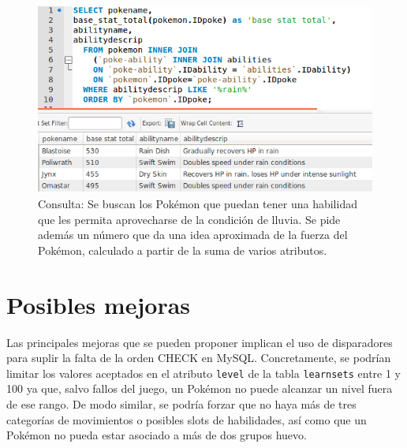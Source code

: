 \documentclass{scrartcl}
\begin{document}
\begin{figure}[ht]
\centering
\includegraphics[scale=0.6]{consultarain}
\caption{Consulta: Se buscan los Pokémon que puedan tener una habilidad que les permita aprovecharse de la condición de lluvia. Se pide además un número que da una idea aproximada de la fuerza del Pokémon, calculado a partir de la suma de varios atributos.}
\label{fig:rain}
\end{figure}

\clearpage
\section{Posibles mejoras}
Las principales mejoras que se pueden proponer implican el uso de disparadores para suplir la falta de la orden CHECK en MySQL. Concretamente, se podrían limitar los valores aceptados en el atributo \texttt{level} de la tabla \texttt{learnsets} entre 1 y 100 ya que, salvo fallos del juego, un Pokémon no puede alcanzar un nivel fuera de ese rango. De modo similar, se podría forzar que no haya más de tres categorías de movimientos o posibles slots de habilidades, así como que un Pokémon no pueda estar asociado a más de dos grupos huevo.\par
\end{document}
